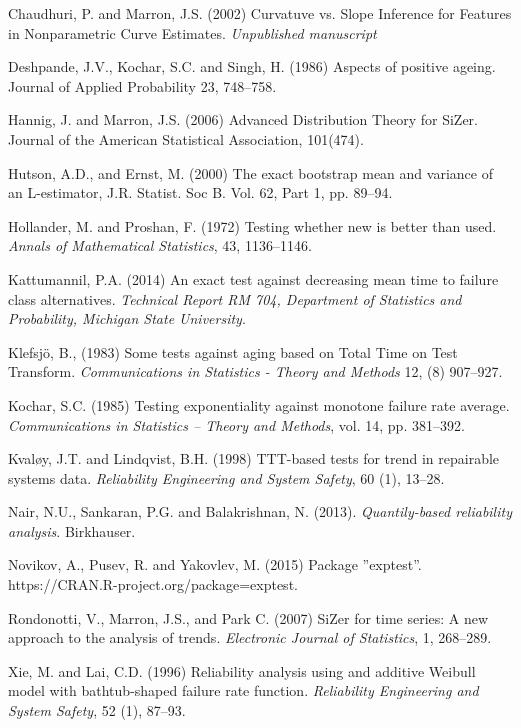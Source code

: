 \documentclass[preprint,12pt]{elsarticle}
\begin{document}
\begin{thebibliography}{}
 Chaudhuri, P. and Marron, J.S. (2002) Curvatuve vs. Slope Inference for Features in Nonparametric Curve Estimates. {\it Unpublished manuscript}

 Deshpande, J.V., Kochar, S.C. and Singh, H. (1986) Aspects of positive ageing. Journal of Applied  Probability 23, 748--758.

 Hannig, J. and Marron, J.S. (2006) Advanced Distribution Theory for SiZer. Journal of the American Statistical Association, 101(474). 

 Hutson, A.D., and Ernst, M. (2000) The exact bootstrap mean and variance of an L-estimator, J.R. Statist. Soc B. Vol. 62, Part 1, pp. 89--94.

  Hollander, M. and Proshan, F. (1972) Testing whether new is better than used. {\it Annals of Mathematical Statistics},  43, 1136--1146.

 Kattumannil, P.A. (2014) An exact test against decreasing mean time to failure class alternatives. {\it Technical Report RM 704, Department of Statistics and Probability, Michigan State University}.

 Klefsjö, B., (1983) Some tests against aging based on Total Time on Test Transform. {\it Communications in Statistics - Theory and Methods} 12, (8) 907--927.


 Kochar, S.C. (1985) Testing exponentiality against monotone failure rate average. {\it Communications in Statistics – Theory and Methods}, vol. 14, pp. 381–392.

 Kvaløy, J.T. and Lindqvist, B.H. (1998) TTT-based tests for trend in repairable systems data. {\it Reliability Engineering and System Safety}, 60 (1), 13--28.




 Nair, N.U., Sankaran, P.G. and Balakrishnan, N. (2013). {\it Quantily-based reliability analysis}. Birkhauser.

 Novikov, A., Pusev, R. and Yakovlev, M. (2015) Package ''exptest''.  https://CRAN.R-project.org/package=exptest.

 Rondonotti, V., Marron, J.S., and Park C. (2007) SiZer for time series: A new approach to the analysis of trends. {\it Electronic Journal of Statistics}, 1, 268--289.

 Xie, M. and Lai, C.D. (1996) Reliability analysis using and additive Weibull model with bathtub-shaped failure rate function. {\it Reliability Engineering and System Safety}, 52 (1), 87--93.
\end{thebibliography}
\end{document}
